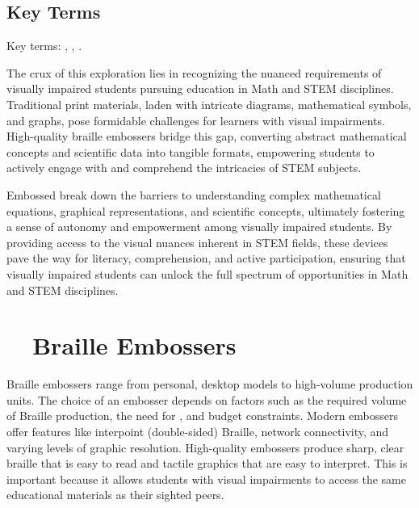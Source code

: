 \subsection{Key Terms}\label{chap4:key-terms}
Key terms: , , .

The crux of this exploration lies in recognizing the nuanced requirements of visually impaired students pursuing education in Math and STEM disciplines. Traditional print materials, laden with intricate diagrams, mathematical symbols, and graphs, pose formidable challenges for learners with visual impairments. High-quality braille embossers bridge this gap, converting abstract mathematical concepts and scientific data into tangible formats, empowering students to actively engage with and comprehend the intricacies of STEM subjects.

Embossed  break down the barriers to understanding complex mathematical equations, graphical representations, and scientific concepts, ultimately fostering a sense of autonomy and empowerment among visually impaired students. By providing access to the visual nuances inherent in STEM fields, these devices pave the way for literacy, comprehension, and active participation, ensuring that visually impaired students can unlock the full spectrum of opportunities in Math and STEM disciplines.\supercite{NYUWorkflow, ProBlind}

\section{~~Braille Embossers}\label{ch4:sec:embossers}

Braille embossers range from personal, desktop models to high-volume production units. The choice of an embosser depends on factors such as the required volume of Braille production, the need for , and budget constraints. Modern embossers offer features like interpoint (double-sided) Braille, network connectivity, and varying levels of graphic resolution. High-quality embossers produce sharp, clear braille that is easy to read and tactile graphics that are easy to interpret. This is important because it allows students with visual impairments to access the same educational materials as their sighted peers.\supercite{DuxburyProducts, ViewPlusProduct}

